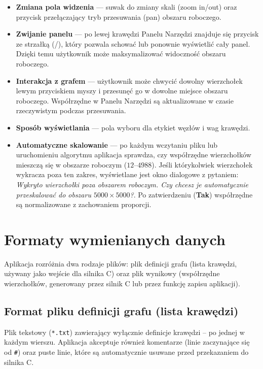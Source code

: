 \documentclass[a4paper, 11pt]{article}
\begin{document}
\begin{itemize}
  \item \textbf{Zmiana pola widzenia} --- suwak do zmiany skali (zoom in/out) oraz przycisk prze\l{}\k{a}czaj\k{a}cy tryb przesuwania (pan) obszaru roboczego.

  \item \textbf{Zwijanie panelu} --- po lewej kraw\k{e}dzi Panelu Narz\k{e}dzi znajduje si\k{e} przycisk ze strza\l{}k\k{a} (\texttt{\guillemotleft}/\texttt{\guillemotright}), kt\'ory pozwala schowa\'c lub ponownie wy\'swietli\'c ca\l{}y panel. Dzi\k{e}ki temu u\.zytkownik mo\.ze maksymalizowa\'c widoczno\'s\'c obszaru roboczego.

  \item \textbf{Interakcja z grafem} --- u\.zytkownik mo\.ze chwyci\'c dowolny wierzcho\l{}ek lewym przyciskiem myszy i przesun\k{e}\'c go w dowolne miejsce obszaru roboczego. Wsp\'o\l{}rz\k{e}dne w Panelu Narz\k{e}dzi s\k{a} aktualizowane w czasie rzeczywistym podczas przesuwania.

  \item \textbf{Spos\'ob wy\'swietlania} --- pola wyboru dla etykiet w\k{e}z\l{}\'ow i wag kraw\k{e}dzi.

  \item \textbf{Automatyczne skalowanie} --- po ka\.zdym wczytaniu pliku lub uruchomieniu algorytmu aplikacja sprawdza, czy wsp\'o\l{}rz\k{e}dne wierzcho\l{}k\'ow mieszcz\k{a} si\k{e} w obszarze roboczym ($12$--$4988$). Je\'sli kt\'orykolwiek wierzcho\l{}ek wykracza poza ten zakres, wy\'swietlane jest okno dialogowe z pytaniem: \textit{\guillemotleft{}Wykryto wierzcho\l{}ki poza obszarem roboczym. Czy chcesz je automatycznie przeskalowa\'c do obszaru $5000 \times 5000$?\guillemotright{}}. Po zatwierdzeniu (\textbf{Tak}) wsp\'o\l{}rz\k{e}dne s\k{a} normalizowane z zachowaniem proporcji.
\end{itemize}

\section{Formaty wymienianych danych}

Aplikacja rozróżnia dwa rodzaje plików: plik definicji grafu (lista krawędzi, używany jako wejście dla silnika C) oraz plik wynikowy (współrzędne wierzchołków, generowany przez silnik C lub przez funkcję zapisu aplikacji).

\subsection{Format pliku definicji grafu (lista krawędzi)}
Plik tekstowy (\texttt{*.txt}) zawierający wyłącznie definicje krawędzi – po jednej w każdym wierszu. Aplikacja akceptuje również komentarze (linie zaczynające się od \texttt{\#}) oraz puste linie, które są automatycznie usuwane przed przekazaniem do silnika C.
\end{document}
